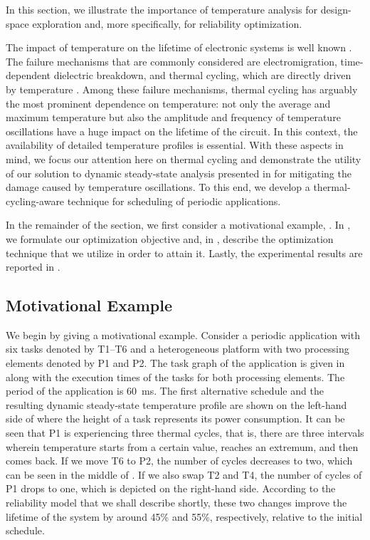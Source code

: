 In this section, we illustrate the importance of temperature analysis for
design-space exploration and, more specifically, for reliability optimization.

The impact of temperature on the lifetime of electronic systems is well known
\cite{srinivasan2004, coskun2006, xiang2010, jedec2016}. The failure mechanisms
that are commonly considered are electromigration, time-dependent dielectric
breakdown, and thermal cycling, which are directly driven by temperature
\cite{jedec2016}. Among these failure mechanisms, thermal cycling has arguably
the most prominent dependence on temperature: not only the average and maximum
temperature but also the amplitude and frequency of temperature oscillations
have a huge impact on the lifetime of the circuit. In this context, the
availability of detailed temperature profiles is essential. With these aspects
in mind, we focus our attention here on thermal cycling and demonstrate the
utility of our solution to dynamic steady-state analysis presented in
 for mitigating the damage caused by
temperature oscillations. To this end, we develop a thermal-cycling-aware
technique for scheduling of periodic applications.

In the remainder of the section, we first consider a motivational example,
. In , we formulate
our optimization objective and, in , describe the
optimization technique that we utilize in order to attain it. Lastly, the
experimental results are reported in .

\subsection{Motivational Example}

We begin by giving a motivational example. Consider a periodic application with
six tasks denoted by T1--T6 and a heterogeneous platform with two processing
elements denoted by P1 and P2. The task graph of the application is given in
 along with the execution times of the tasks
for both processing elements. The period of the application is 60~ms. The first
alternative schedule and the resulting dynamic steady-state temperature profile
are shown on the left-hand side of  where the
height of a task represents its power consumption. It can be seen that P1 is
experiencing three thermal cycles, that is, there are three intervals wherein
temperature starts from a certain value, reaches an extremum, and then comes
back. If we move T6 to P2, the number of cycles decreases to two, which can be
seen in the middle of . If we also swap T2 and T4,
the number of cycles of P1 drops to one, which is depicted on the right-hand
side. According to the reliability model that we shall describe shortly, these
two changes improve the lifetime of the system by around 45\% and 55\%,
respectively, relative to the initial schedule.

